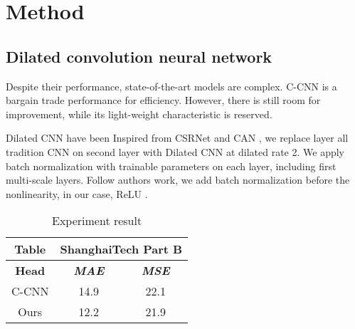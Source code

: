 \section{Method}

\subsection{Dilated convolution neural network}
Despite their performance, state-of-the-art models are complex. C-CNN is a bargain trade performance for efficiency. However, there is still room for improvement, while its light-weight characteristic is reserved. 

Dilated CNN have been  Inspired from CSRNet \cite{li2018csrnet} and CAN \cite{liu2019context}, we replace layer all tradition CNN on second layer with Dilated CNN at dilated rate 2. We apply batch normalization \cite{ioffe2015batch} with trainable parameters on each layer, including first multi-scale layers. Follow authors work, we add batch normalization before the nonlinearity, in our case, ReLU \cite{agarap2018deep}. 

\begin{table}[htbp]
\caption{Experiment result}
\begin{center}
\begin{tabular}{|c|c|c|}
\hline
\textbf{Table}&\multicolumn{2}{|c|}{\textbf{ShanghaiTech Part B}} \\
\hline
\textbf{Head} & \textbf{\textit{MAE}}& \textbf{\textit{MSE}} \\
\hline
C-CNN & 14.9 & 22.1  \\
\hline
Ours & 12.2 & 21.9  \\
\hline
\end{tabular}
\label{tab1}
\end{center}
\end{table}